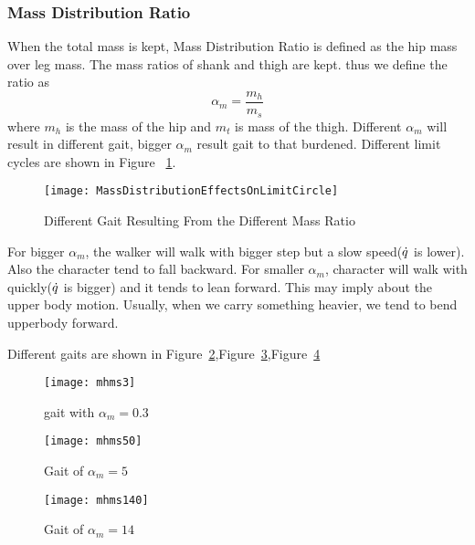 \subsubsection*{Mass Distribution Ratio}
When the total mass is kept,
Mass Distribution Ratio is defined as the hip mass over leg mass. 
The mass ratios of shank and thigh are kept.
thus we define the ratio as
\[
\alpha_m=\frac{m_h}{m_s}
\]
where $m_h$ is the mass of the hip and $m_t$ is mass of the thigh.
Different $\alpha_m$ will result in different gait, bigger $\alpha_m$ result gait to that burdened.
Different limit cycles are shown in Figure ~\ref{fig:differentmh}.
\begin{figure}[!htbp]
  \begin{center}
     \texttt{[image: MassDistributionEffectsOnLimitCircle]}
    \caption{Different Gait Resulting From the Different Mass Ratio}
    \label{fig:differentmh}
\end{center}
\end{figure}

For bigger $\alpha_m$, the walker will walk with bigger step but a slow speed($\dot{q}$ is lower).
Also the character tend to fall backward.
For smaller $\alpha_m$, character will walk with quickly($\dot{q}$ is bigger) and it tends to lean forward.
This may imply about the upper body motion.
Usually, when we carry something heavier, we  tend to bend upperbody forward.

Different gaits are shown in Figure~\ref{fig:massh1},Figure~\ref{fig:massh2},Figure~\ref{fig:massh3}
\begin{figure}[!htbp]
  \begin{center}
      \texttt{[image: mhms3]}
    \caption{gait with $\alpha_m=0.3$}
    \label{fig:massh1}
\end{center}
\end{figure}

\begin{figure}[!htbp]
  \begin{center}
      \texttt{[image: mhms50]}
    \caption{Gait of $\alpha_m=5$}
    \label{fig:massh2}
\end{center}
\end{figure}

\begin{figure}[!htbp]
  \begin{center}
      \texttt{[image: mhms140]}
    \caption{Gait of $\alpha_m=14$}
    \label{fig:massh3}
\end{center}
\end{figure}



